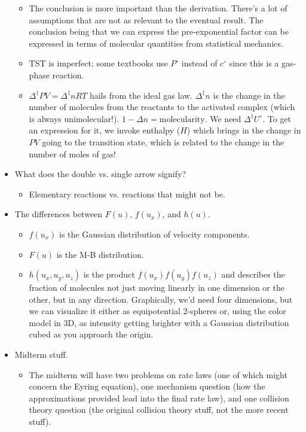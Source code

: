 \documentclass[../notes.tex]{subfiles}
\begin{document}
\begin{itemize}
\begin{itemize}
        \item The conclusion is more important than the derivation. There's a lot of assumptions that are not as relevant to the eventual result. The conclusion being that we can express the pre-exponential factor can be expressed in terms of molecular quantities from statistical mechanics.
        \item TST is imperfect; some textbooks use $P^\circ$ instead of $c^\circ$ since this is a gas-phase reaction.
        \item $\Delta^\ddagger PV=\Delta^\ddagger nRT$ hails from the ideal gas law. $\Delta^\ddagger n$ is the change in the number of molecules from the reactants to the activated complex (which is always unimolecular!). $1-\Delta n=\text{molecularity}$. We need $\Delta^\ddagger U^\circ$. To get an expression for it, we invoke enthalpy ($H$) which brings in the change in $PV$ going to the transition state, which is related to the change in the number of moles of gas!
    \end{itemize}
    \item What does the double vs. single arrow signify?
    \begin{itemize}
        \item Elementary reactions vs. reactions that might not be.
    \end{itemize}
    \item The differences between $F(u)$, $f(u_x)$, and $h(u)$.
    \begin{itemize}
        \item $f(u_x)$ is the Gaussian distribution of velocity components.
        \item $F(u)$ is the M-B distribution.
        \item $h(u_x,u_y,u_z)$ is the product $f(u_x)f(u_y)f(u_z)$ and describes the fraction of molecules not just moving linearly in one dimension or the other, but in any direction. Graphically, we'd need four dimensions, but we can visualize it either as equipotential 2-spheres or, using the color model in 3D, as intensity getting brighter with a Gaussian distribution cubed as you approach the origin.
    \end{itemize}
    \item Midterm stuff.
    \begin{itemize}
        \item The midterm will have two problems on rate laws (one of which might concern the Eyring equation), one mechanism question (how the approximations provided lead into the final rate law), and one collision theory question (the original collision theory stuff, not the more recent stuff).

\end{itemize}
\end{itemize}
\end{document}

